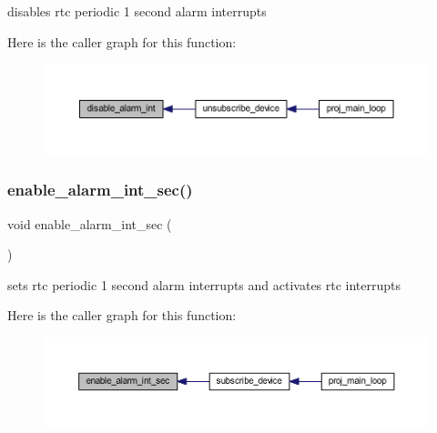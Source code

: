 disables rtc periodic 1 second alarm interrupts 

Here is the caller graph for this function\+:
\nopagebreak
\begin{figure}[H]
\begin{center}
\leavevmode
\includegraphics[width=350pt]{group__rtc_ga30044c66dde8528c3f783e9847820e7c_icgraph}
\end{center}
\end{figure}
\mbox{\label{group__rtc_gab66aa80b8eeaab07c9b7d58bd55d915e}} 
\subsubsection{\texorpdfstring{enable\+\_\+alarm\+\_\+int\+\_\+sec()}{enable\_alarm\_int\_sec()}}
{\footnotesize\ttfamily void enable\+\_\+alarm\+\_\+int\+\_\+sec (\begin{DoxyParamCaption}{ }\end{DoxyParamCaption})}



sets rtc periodic 1 second alarm interrupts and activates rtc interrupts 

Here is the caller graph for this function\+:
\nopagebreak
\begin{figure}[H]
\begin{center}
\leavevmode
\includegraphics[width=350pt]{group__rtc_gab66aa80b8eeaab07c9b7d58bd55d915e_icgraph}
\end{center}
\end{figure}
\mbox{\label{group__rtc_ga322a0169ef9255eb9b048ab656fd6b06}} 
